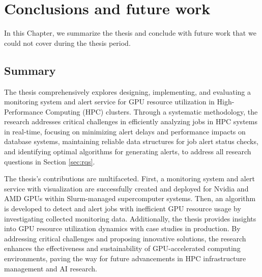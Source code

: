 \chapter{Conclusions and future work}
\label{chap:conclusions}
In this Chapter, we summarize the thesis and conclude with future work that we could not cover during the thesis period.

\section{Summary}

The thesis comprehensively explores designing, implementing, and evaluating a monitoring system and alert service for GPU resource utilization in High-Performance Computing (HPC) clusters. Through a systematic methodology, the research addresses critical challenges in efficiently analyzing jobs in HPC systems in real-time, focusing on minimizing alert delays and performance impacts on database systems, maintaining reliable data structures for job alert status checks, and identifying optimal algorithms for generating alerts, to address all research questions in Section \ref{sec:rqs}.

The thesis's contributions are multifaceted. First, a monitoring system and alert service with visualization are successfully created and deployed for Nvidia and AMD GPUs within Slurm-managed supercomputer systems. Then, an algorithm is developed to detect and alert jobs with inefficient GPU resource usage by investigating collected monitoring data. Additionally, the thesis provides insights into GPU resource utilization dynamics with case studies in production. By addressing critical challenges and proposing innovative solutions, the research enhances the effectiveness and sustainability of GPU-accelerated computing environments, paving the way for future advancements in HPC infrastructure management and AI research.



